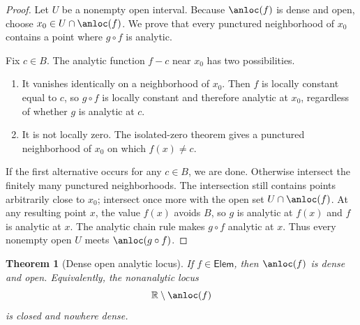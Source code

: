 \documentclass[11pt,oneside]{article}
\newtheorem{theorem}{Theorem}[section]
\theoremstyle{definition}
\theoremstyle{remark}
\newcommand{\R}{\mathbb R}
\begin{document}
\begin{proof}
Let $U$ be a nonempty open interval.  Because $\anloc(f)$ is dense and open, choose
$x_0\in U\cap\anloc(f)$.  We prove that every punctured neighborhood of $x_0$ contains a
point where $g\circ f$ is analytic.

Fix $c\in B$.  The analytic function $f-c$ near $x_0$ has two possibilities.
\begin{enumerate}
 \item It vanishes identically on a neighborhood of $x_0$.  Then $f$ is locally constant
 equal to $c$, so $g\circ f$ is locally constant and therefore analytic at $x_0$, regardless
 of whether $g$ is analytic at $c$.
 \item It is not locally zero.  The isolated-zero theorem gives a punctured neighborhood of
 $x_0$ on which $f(x)\ne c$.
\end{enumerate}
If the first alternative occurs for any $c\in B$, we are done.  Otherwise intersect the
finitely many punctured neighborhoods.  The intersection still contains points arbitrarily
close to $x_0$; intersect once more with the open set $U\cap\anloc(f)$.  At any resulting
point $x$, the value $f(x)$ avoids $B$, so $g$ is analytic at $f(x)$ and $f$ is analytic at
$x$.  The analytic chain rule makes $g\circ f$ analytic at $x$.  Thus every nonempty open
$U$ meets $\anloc(g\circ f)$.
\end{proof}

\begin{theorem}[Dense open analytic locus]
\label{integration:thm:elementary-dense-analytic}
If $f\in\mathsf{Elem}$, then $\anloc(f)$ is dense and open.  Equivalently, the nonanalytic
locus
\begin{equation}
 \R\setminus\anloc(f)
 \label{integration:eq:elementary-exceptional-set}
\end{equation}
is closed and nowhere dense.
\end{theorem}
\end{document}
